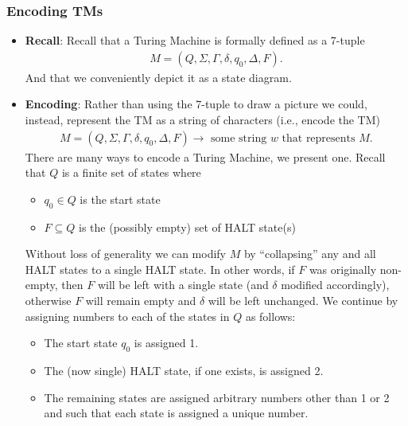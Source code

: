 \documentclass{report}
\begin{document}
    \subsubsection{Encoding TMs}
    \begin{itemize}
        \item \textbf{Recall}: Recall that a Turing Machine is formally defined as a 7-tuple
            \begin{align*}
                M = (Q, \Sigma, \Gamma, \delta, q_{0}, \Delta, F)
            .\end{align*}
            \bigbreak \noindent 
            And that we conveniently depict it as a state diagram. 
        \item \textbf{Encoding}: Rather than using the 7-tuple to draw a picture we could, instead, represent the TM as a string of characters (i.e., encode the TM)
            \begin{align*}
                M = (Q, \Sigma, \Gamma, \delta, q_{0}, \Delta, F) \to \text{ some string $w$ that represents $M$}
            .\end{align*}
            \bigbreak \noindent 
            There are many ways to encode a Turing Machine, we present one.
            \bigbreak \noindent 
            Recall that $Q$ is a finite set of states where
            \begin{itemize}
                \item $q_{0} \in Q$ is the start state
                \item $F \subseteq Q$ is the (possibly empty) set of HALT state(s)
            \end{itemize}
            \bigbreak \noindent 
            Without loss of generality we can modify $M$ by “collapsing” any and all HALT states to a single HALT state.
            \bigbreak \noindent 
            In other words, if $F$ was originally non-empty, then $F$ will be left with a single state (and $\delta$ modified accordingly), otherwise $F$ will remain empty and $\delta$ will be left unchanged.
            \bigbreak \noindent 
            We continue by assigning numbers to each of the states in $Q$ as follows:
            \begin{itemize}
                \item The start state $q_{0}$ is assigned 1.
                \item The (now single) HALT state, if one exists, is assigned 2.
                \item The remaining states are assigned arbitrary numbers other than 1 or 2 and such that each state is assigned a unique number.

\end{itemize}
\end{itemize}
\end{document}
